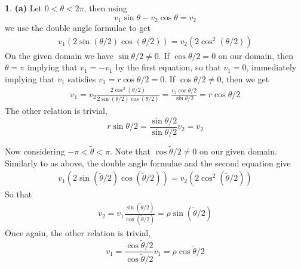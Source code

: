 \documentclass[10.5pt]{article}
\theoremstyle{definition}
\newtheorem{pb}{}
\newcommand{\tth}{\tilde{\theta}}
\begin{document}
    \begin{pb}
        \textbf{(a)} Let \(0 < \theta < 2\pi\), then using
        \[v_1\sin\theta - v_2\cos\theta = v_2\]
        we use the double angle formulae to get
        \begin{align*}
            v_1(2\sin(\theta/2)\cos(\theta/2)) = v_2 (2\cos^2(\theta/2))
        \end{align*}
        On the given domain we have \(\sin \theta/2 \neq 0\). If \(\cos \theta/2 = 0\) on our domain, then \(\theta = \pi\) implying that
        \(v_1 = -v_1\) by the first equation, so that \(v_1 = 0\), immediately implying that \(v_1\) satisfies
        \(v_1 = r\cos\theta/2 = 0\). If \(\cos \theta/2 \neq 0\), then we get
        \begin{align*}
            v_1 = v_2\frac{2\cos^2(\theta/2)}{2\sin(\theta/2)\cos(\theta/2)} = \frac{v_2\cos\theta/2}{\sin\theta/2} = r\cos\theta/2
        \end{align*}
        The other relation is trivial,
        \[r\sin\theta/2 = \frac{\sin\theta/2}{\sin\theta/2}v_2 = v_2\]

        Now considering \(-\pi < \tilde{\theta} < \pi\). Note that \(\cos\tth/2 \neq 0\) on our given domain. Similarly to as above, the double angle formulae
        and the second equation give
        \begin{align*}
            v_1(2\sin(\tth/2)\cos(\tth/2)) = v_2 (2\cos^2(\tth/2))
        \end{align*}
        So that
        \begin{align*}
            v_2 = v_1\frac{\sin(\tth/2)}{\cos(\tth/2)} = \rho\sin(\tth/2)
        \end{align*}
        Once again, the other relation is trivial,
        \[v_1 = \frac{\cos\tth/2}{\cos\tth/2}v_1 = \rho \cos\tth/2\]


\end{pb}
\end{document}
